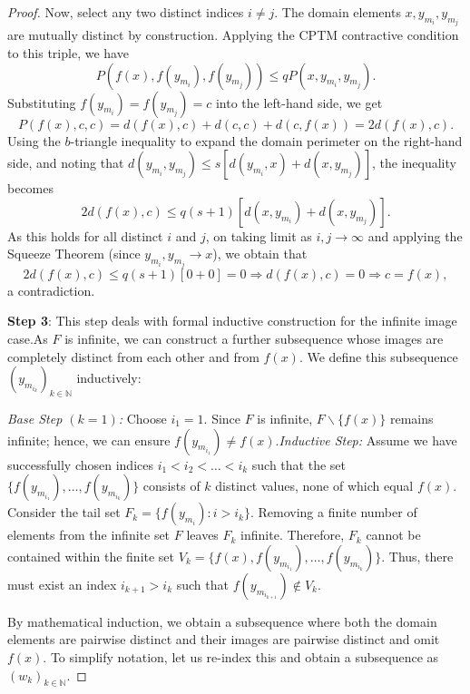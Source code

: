 \documentclass[a4paper,12pt,oneside]{article}
\numberwithin{equation}{section}
\begin{document}
\begin{proof}
Now, select any two distinct indices $i\neq j$. The domain elements $x,y_{m_i},y_{m_j}$ are mutually distinct by construction. Applying the CPTM contractive condition to this triple, we have
\[
P(f(x),f(y_{m_i}),f(y_{m_j}))\leq qP(x,y_{m_i},y_{m_j}).
\]
Substituting $f(y_{m_i}) = f(y_{m_j}) = c$ into the left-hand side, we get
\[
P(f(x),c,c) = d(f(x),c) + d(c,c) + d(c,f(x)) = 2d(f(x),c).
\]
Using the $b$-triangle inequality to expand the domain perimeter on the right-hand side, and noting that $d(y_{m_i},y_{m_j})\leq s[d(y_{m_i},x) + d(x,y_{m_j})]$, the inequality becomes
\[
2d(f(x),c)\leq q(s + 1)\left[d(x,y_{m_i}) + d(x,y_{m_j})\right].
\]
As this holds for all distinct $i$ and $j$, on taking limit as $i,j\to \infty$ and applying the Squeeze Theorem (since $y_{m_i},y_{m_j}\to x$), we obtain that
\[
2d(f(x),c)\leq q(s + 1)[0 + 0] = 0\Rightarrow d(f(x),c) = 0\Rightarrow c = f(x),
\]
a contradiction.

\textbf{Step 3}: This step deals with formal inductive construction for the infinite image case.\newline As $F$ is infinite, we can construct a further subsequence whose images are completely distinct from each other and from $f(x)$. We define this subsequence $(y_{m_{i_k}})_{k \in \mathbb{N}}$ inductively:

\textit{Base Step $(k = 1)$:} Choose $i_{1} = 1$. Since $F$ is infinite, $F\backslash \{f(x)\}$ remains infinite; hence, we can ensure $f(y_{m_{i_1}})\neq f(x)$.\newline \textit{Inductive Step:} Assume we have successfully chosen indices $i_1< i_2< \dots < i_k$ such that the set $\{f(y_{m_{i_1}}),\ldots,f(y_{m_{i_k}})\}$ consists of $k$ distinct values, none of which equal $f(x)$. Consider the tail set $F_{k} = \{f(y_{m_{i}}):i > i_{k}\}$. Removing a finite number of elements from the infinite set $F$ leaves $F_{k}$ infinite. Therefore, $F_{k}$ cannot be contained within the finite set $V_{k} = \{f(x),f(y_{m_{i_1}}),\ldots,f(y_{m_{i_k}})\}$. Thus, there must exist an index $i_{k + 1} > i_{k}$ such that $f(y_{m_{i_{k + 1}}})\notin V_{k}$.

By mathematical induction, we obtain a subsequence where both the domain elements are pairwise distinct and their images are pairwise distinct and omit $f(x)$. To simplify notation, let us re-index this and obtain a subsequence as $(w_{k})_{k \in \mathbb{N}}$.


\end{proof}
\end{document}
